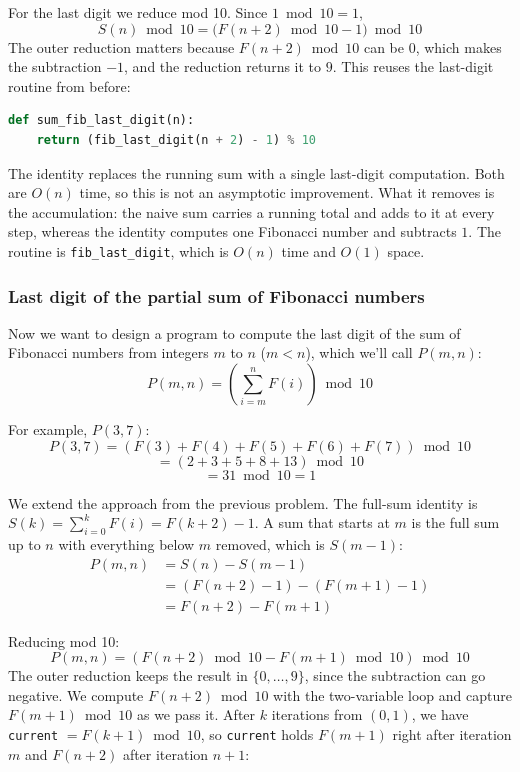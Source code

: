 For the last digit we reduce mod 10. Since $1 \bmod 10 = 1$,
\[
S(n) \bmod 10 = \big(F(n+2) \bmod 10 - 1\big) \bmod 10
\]
The outer reduction matters because $F(n+2) \bmod 10$ can be $0$, which makes the subtraction $-1$, and the reduction returns it to $9$. This reuses the last-digit routine from before:

\medskip

\begin{lstlisting}[language=Python]
def sum_fib_last_digit(n):
    return (fib_last_digit(n + 2) - 1) % 10
\end{lstlisting}

The identity replaces the running sum with a single last-digit computation. Both are $O(n)$ time, so this is not an asymptotic improvement. What it removes is the accumulation: the naive sum carries a running total and adds to it at every step, whereas the identity computes one Fibonacci number and subtracts $1$. The routine is \texttt{fib\_last\_digit}, which is $O(n)$ time and $O(1)$ space.

\bigskip

\subsubsection{Last digit of the partial sum of Fibonacci numbers}

\medskip

Now we want to design a program to compute the last digit of the sum of Fibonacci numbers from integers $m$ to $n$ ($m < n$), which we'll call $P(m, n)$:
\[
P(m, n) = \left( \sum\limits_{i=m}^n F(i) \right) \bmod 10
\]

For example, $P(3, 7)$:
\[
P(3, 7) = \left( F(3) + F(4) + F(5) + F(6) + F(7) \right) \bmod 10
\]
\[
= (2 + 3 + 5 + 8 + 13) \bmod 10
\]
\[
= 31 \bmod 10 = 1
\]

We extend the approach from the previous problem. The full-sum identity is $S(k) = \sum_{i=0}^{k} F(i) = F(k+2) - 1$. A sum that starts at $m$ is the full sum up to $n$ with everything below $m$ removed, which is $S(m-1)$:
\begin{align*}
P(m, n) &= S(n) - S(m-1) \\
        &= (F(n+2) - 1) - (F(m+1) - 1) \\
        &= F(n+2) - F(m+1)
\end{align*}

Reducing mod 10:
\[
P(m, n) = \left( F(n+2) \bmod 10 - F(m+1) \bmod 10 \right) \bmod 10
\]
The outer reduction keeps the result in $\{0, \dots, 9\}$, since the subtraction can go negative. We compute $F(n+2) \bmod 10$ with the two-variable loop and capture $F(m+1) \bmod 10$ as we pass it. After $k$ iterations from $(0, 1)$, we have \texttt{current} $= F(k+1) \bmod 10$, so \texttt{current} holds $F(m+1)$ right after iteration $m$ and $F(n+2)$ after iteration $n+1$:

